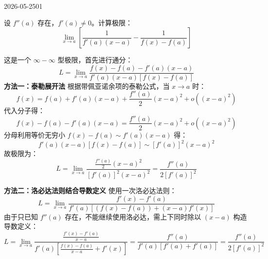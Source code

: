 \begin{mistake}{2026-05-25}{01}

\begin{problemcontent}
设 \(f''(a)\) 存在，\(f'(a) \neq 0\)。计算极限：
\[ \lim_{x \to a} \left[ \frac{1}{f'(a)(x-a)} - \frac{1}{f(x) - f(a)} \right] \]
\end{problemcontent}

\begin{solutioncontent}
这是一个 \(\infty - \infty\) 型极限，首先进行通分：
\[ L = \lim_{x \to a} \frac{f(x) - f(a) - f'(a)(x-a)}{f'(a)(x-a)[f(x) - f(a)]} \]
\textbf{方法一：泰勒展开法}
根据带佩亚诺余项的泰勒公式，当 \(x \to a\) 时：
\[ f(x) = f(a) + f'(a)(x-a) + \frac{f''(a)}{2}(x-a)^2 + o((x-a)^2) \]
代入分子得：
\[ f(x) - f(a) - f'(a)(x-a) = \frac{f''(a)}{2}(x-a)^2 + o((x-a)^2) \]
分母利用等价无穷小 \(f(x) - f(a) \sim f'(a)(x-a)\) 得：
\[ f'(a)(x-a)[f(x) - f(a)] \sim [f'(a)]^2 (x-a)^2 \]
故极限为：
\[ L = \lim_{x \to a} \frac{\frac{f''(a)}{2}(x-a)^2}{[f'(a)]^2 (x-a)^2} = \frac{f''(a)}{2[f'(a)]^2} \]

\textbf{方法二：洛必达法则结合导数定义}
使用一次洛必达法则：
\[ L = \lim_{x \to a} \frac{f'(x) - f'(a)}{f'(a)[(f(x) - f(a)) + (x-a)f'(x)]} \]
由于只已知 \(f''(a)\) 存在，不能继续使用洛必达，需上下同时除以 \((x-a)\) 构造导数定义：
\[ L = \lim_{x \to a} \frac{\frac{f'(x) - f'(a)}{x-a}}{f'(a) \left[ \frac{f(x) - f(a)}{x-a} + f'(x) \right]} = \frac{f''(a)}{f'(a)[f'(a) + f'(a)]} = \frac{f''(a)}{2[f'(a)]^2} \]
\end{solutioncontent}


\end{mistake}
